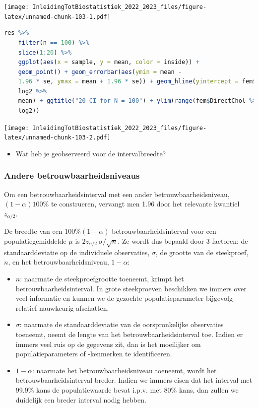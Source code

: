 \documentclass[
  12pt,dutch,coursenotes]{book}
\providecommand{\tightlist}{%
  \setlength{\itemsep}{0pt}\setlength{\parskip}{0pt}}
\begin{document}
\texttt{[image: InleidingTotBiostatistiek\_2022\_2023\_files/figure-latex/unnamed-chunk-103-1.pdf]}

\begin{lstlisting}[language=R]
res %>%
    filter(n == 100) %>%
    slice(1:20) %>%
    ggplot(aes(x = sample, y = mean, color = inside)) +
    geom_point() + geom_errorbar(aes(ymin = mean -
    1.96 * se, ymax = mean + 1.96 * se)) + geom_hline(yintercept = fem$DirectChol %>%
    log2 %>%
    mean) + ggtitle("20 CI for N = 100") + ylim(range(fem$DirectChol %>%
    log2))
\end{lstlisting}

\texttt{[image: InleidingTotBiostatistiek\_2022\_2023\_files/figure-latex/unnamed-chunk-103-2.pdf]}

\begin{itemize}
\tightlist
\item
  Wat heb je geobserveerd voor de intervalbreedte?
\end{itemize}

\hypertarget{andere-betrouwbaarheidsniveaus}{%
\subsubsection{Andere betrouwbaarheidsniveaus}\label{andere-betrouwbaarheidsniveaus}}

Om een betrouwbaarheidsinterval met een ander betrouwbaarheidsniveau, \((1- \alpha)100\%\) te construeren, vervangt men 1.96 door het relevante kwantiel \(z_{\alpha/2}.\)

De breedte van een \(100\%(1-\alpha)\) betrouwbaarheidsinterval voor een
populatiegemiddelde \(\mu\) is \(2 z_{\alpha/2} \ \sigma/\sqrt{n}\). Ze wordt
dus bepaald door 3 factoren: de standaarddeviatie op de individuele
observaties, \(\sigma\), de grootte van de steekproef, \(n\), en het
betrouwbaarheidsniveau, \(1-\alpha\):

\begin{itemize}
\item
  \(n\): naarmate de steekproefgrootte toeneemt, krimpt het
  betrouwbaarheidsinterval. In grote steekproeven beschikken we immers over veel informatie en kunnen we de gezochte populatieparameter bijgevolg relatief nauwkeurig afschatten.
\item
  \(\sigma\): naarmate de standaarddeviatie van de oorspronkelijke
  observaties toeneemt, neemt de lengte van het betrouwbaarheidsinterval toe. Indien er immers veel ruis op de gegevens zit, dan is het moeilijker om populatieparameters of -kenmerken te identificeren.
\item
  \(1-\alpha\): naarmate het betrouwbaarheidsniveau toeneemt, wordt het
  betrouwbaarheidsinterval breder. Indien we immers eisen dat het interval met 99.9\% kans de populatiewaarde bevat i.p.v. met 80\% kans, dan zullen we duidelijk een breder interval nodig hebben.
\end{itemize}
\end{document}
